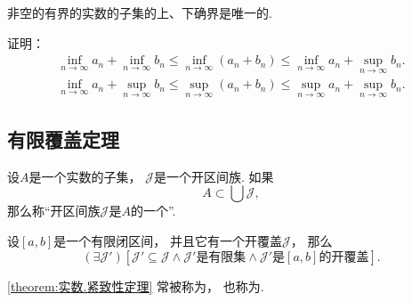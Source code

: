 \begin{theorem}
非空的有界的实数的子集的上、下确界是唯一的.
\end{theorem}

\begin{example}\label{example:实数.确界的序}
%
证明：\begin{gather}
	\inf_{n\to\infty} a_n
	+ \inf_{n\to\infty} b_n
	\leq \inf_{n\to\infty} (a_n + b_n)
	\leq \inf_{n\to\infty} a_n
	+ \sup_{n\to\infty} b_n. \\
	\inf_{n\to\infty} a_n
	+ \sup_{n\to\infty} b_n
	\leq \sup_{n\to\infty} (a_n + b_n)
	\leq \sup_{n\to\infty} a_n
	+ \sup_{n\to\infty} b_n.
\end{gather}
\end{example}

\subsection{有限覆盖定理}
\begingroup
\def\J{\mathscr{J}}%
\begin{definition}
设\(A\)是一个实数的子集，
\(\J\)是一个开区间族.
如果\[
	A \subset \bigcup \J,
\]
那么称“开区间族\(\J\)是\(A\)的一个”.
\end{definition}

\begin{theorem}[紧致性定理]\label{theorem:实数.紧致性定理}
设\([a,b]\)是一个有限闭区间，
并且它有一个开覆盖\(\J\)，
那么\[
	(\exists \J')
	[
		\J' \subseteq \J
		\land
		\text{\(\J'\)是有限集}
		\land
		\text{\(\J'\)是\([a,b]\)的开覆盖}
	].
\]
\end{theorem}
\cref{theorem:实数.紧致性定理} 常被称为，
也称为.

\endgroup%
